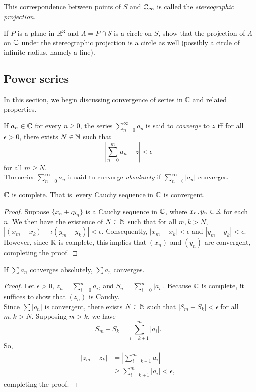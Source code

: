 	This correspondence between points of $S$ and $\mathbb{C}_\infty$ is called the \emph{stereographic projection}. 

	\begin{exercise}
		If $P$ is a plane in $\mathbb{R}^3$ and $\Lambda = P \cap S$ is a circle on $S$, show that the projection of $\Lambda$ on $\mathbb{C}$ under the stereographic projection is a circle as well (possibly a circle of infinite radius, namely a line).
	\end{exercise}

\subsection{Power series}

	In this section, we begin discussing convergence of series in $\mathbb{C}$ and related properties.

	\begin{fdef}
		If $a_n \in \mathbb{C}$ for every $n \ge 0$, the series $\sum_{n=0}^\infty a_n$ is said to \emph{converge} to $z$ iff for all $\epsilon>0$, there exists $N \in \mathbb{N}$ such that
		\[ \left| \sum_{n=0}^m a_n - z  \right| < \epsilon \]
		for all $m \ge N$.\\
		The series $\sum_{n=0}^\infty a_n$ is said to converge \emph{absolutely} if $\sum_{n=0}^\infty |a_n|$ converges.
	\end{fdef}

	\begin{theorem}
		$\mathbb{C}$ is complete. That is, every Cauchy sequence in $\mathbb{C}$ is convergent.
	\end{theorem}
	\begin{proof}
		Suppose $\{x_n + \iota y_n\}$ is a Cauchy sequence in $\mathbb{C}$, where $x_n, y_n \in \mathbb{R}$ for each $n$. We then have the existence of $N \in \mathbb{N}$ such that for all $m,k > N$, $|(x_m - x_k) + \iota(y_m - y_k)| < \epsilon$. Consequently, $|x_m - x_k| < \epsilon$ and $|y_m - y_k| < \epsilon$. However, since $\mathbb{R}$ is complete, this implies that $(x_n)$ and $(y_n)$ are convergent, completing the proof. 
	\end{proof}	

	\begin{theorem}
		If $\sum a_n$ converges absolutely, $\sum a_n$ converges.
	\end{theorem}
	\begin{proof}
		Let $\epsilon > 0$, $z_n = \sum_{i=0}^n a_i$, and $S_n = \sum_{i=0}^n |a_i|$. Because $\mathbb{C}$ is complete, it suffices to show that $(z_n)$ is Cauchy. \\
		Since $\sum |a_n|$ is convergent, there exists $N \in \mathbb{N}$ such that $|S_m - S_k| < \epsilon$ for all $m,k > N$. Supposing $m > k$, we have
		\[ S_m - S_k = \sum_{i=k+1}^m |a_i|. \]
		So,
		\begin{align*}
			|z_m - z_k| &= \left| \sum_{i=k+1}^m a_i \right| \\
				&\ge \sum_{i=k+1}^m |a_i| < \epsilon,
		\end{align*}
		completing the proof.
	\end{proof}

